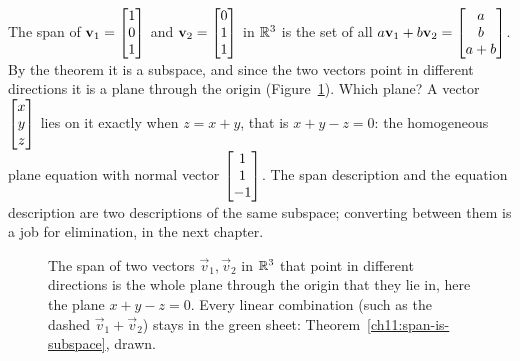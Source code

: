 \begin{example}\label{ch11:span-plane}
The span of $\mathbf{v}_1 = \begin{bmatrix}1\\0\\1\end{bmatrix}$ and $\mathbf{v}_2 = \begin{bmatrix}0\\1\\1\end{bmatrix}$ in $\mathbb{R}^3$ is
the set of all $a\mathbf{v}_1+b\mathbf{v}_2=\begin{bmatrix}a\\b\\a+b\end{bmatrix}$. By the theorem it is a subspace,
and since the two vectors point in different directions it is a plane through the origin
(Figure~\ref{ch11:fig-span-plane}). Which plane? A
vector $\begin{bmatrix}x\\y\\z\end{bmatrix}$ lies on it exactly when $z = x + y$, that is
$x + y - z = 0$: the homogeneous plane equation with normal vector $\begin{bmatrix}1\\1\\-1\end{bmatrix}$. The
span description and the equation description are two descriptions of the same subspace;
converting between them is a job for elimination, in the next chapter.
\end{example}

\begin{figure}[htbp]
\centering
{}
\caption{The span of two vectors $\vec{v}_1,\vec{v}_2$ in $\mathbb{R}^3$ that point in different
directions is the whole plane through the origin that they lie in, here the plane
$x+y-z=0$. Every linear combination (such as the dashed $\vec{v}_1+\vec{v}_2$) stays in
the green sheet: Theorem~\ref{ch11:span-is-subspace}, drawn.}
\label{ch11:fig-span-plane}
\end{figure}

